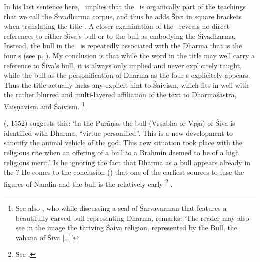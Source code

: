 \documentclass[11pt]{book}
\begin{document}
\noindent
In his last sentence here, \Sanderson\ implies that the
\Vss\ is organically part of the teachings that we call
the Śivadharma corpus, and thus he adds Śiva in
square brackets when translating the title 
\Vss. A closer examination of the \VSS\ 
reveals no direct references to either Śiva's bull or
to the bull as embodying the Śivadharma. Instead, the bull
in the \VSS\ is repeatedly associated with the Dharma that
is the four \asrama s (see p. \pageref{bullasfourasramas}).
My conclusion is that while the word  in the
title may well carry a reference to Śiva's bull, it is always
only implied and never explicitely taught, while the bull as
the personification of Dharma as the four
\asrama s explicitely appears. Thus
the title actually lacks any explicit hint to Śaivism, which
fits in well with the rather blurred and multi-layered 
affiliation of the text to Dharmaśāstra, Vaiṣṇavism and Śaivism.%
		\footnote{See also , who 
			while discussing a seal of Śarvavarman that 
			features a beautifully carved bull representing Dharma,
			remarks: `The reader may also see in the 
			image the thriving Śaiva religion, represented
			by the Bull, the vāhana of Śiva [\dots]'} 





\citeauthor{bhattacharya_nandin_1977} (\citeyear{bhattacharya_nandin_1977}, {1552}) suggests this:
`In the Purāṇas the bull 
(Vṛṣabha or 
Vṛṣa) 
of Śiva is identified with Dharma, ``virtue personified''. 
This is a new development to sanctify the animal 
vehicle of the god. This new situation took place with the religious 
rite when an offering of a bull to a Brahmin deemed to be
of a high religious merit.' Is he ignoring the fact that Dharma as
a bull appears already in the \MBh?
He comes to the conclusion 
()
that one of the earliest sources to fuse the figures
of Nandin and the bull is the relatively early%
		\footnote{See .}
\MatsP.
\end{document}
